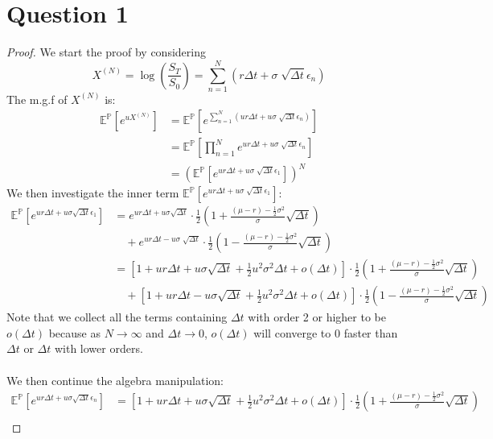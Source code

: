 \documentclass[12pt, letterpaper]{article}
\begin{document}
\part*{Question 1}
\begin{proof}
We start the proof by considering \[X^{(N)} = \log(\frac{S_T}{S_0}) = \sum_{n=1}^N (r\Delta t+\sigma \sqrt[]{\Delta t} \epsilon_n)\]
The m.g.f of $X^{(N)}$ is: \\
\begin{align*}
  \mathbb{E}^\mathbb{P}[e^{u X^{(N)}}] & =  \mathbb{E}^\mathbb{P}[e^{\sum_{n=1}^N (u r\Delta t+u\sigma \sqrt[]{\Delta t} \epsilon_n)}] \\
  & = \mathbb{E}^\mathbb{P} [\prod_{n=1}^N e^{u r\Delta t+u\sigma \sqrt[]{\Delta t} \epsilon_n}] \\
  & = (\mathbb{E}^\mathbb{P} [e^{u r\Delta t+u\sigma \sqrt[]{\Delta t} \epsilon_1}])^N \tag*{as $\epsilon_n$ is i.i.d}
\end{align*}
We then investigate the inner term $\mathbb{E}^\mathbb{P} [e^{u r\Delta t+ u\sigma \sqrt[]{\Delta t} \epsilon_1}]$:
\begin{align*}
  \mathbb{E}^\mathbb{P} [e^{u r\Delta t+u\sigma \sqrt{\Delta t} \epsilon_1}] &= e^{u r\Delta t +u\sigma \sqrt{\Delta t}} \cdot \frac{1}{2} (1 + \frac{(\mu -r) - \frac{1}{2}\sigma^2}{\sigma} \sqrt{\Delta t}) \\ 
    & \quad + e^{u r\Delta t-u\sigma \sqrt[]{\Delta t}} \cdot \frac{1}{2} (1 - \frac{(\mu -r) - \frac{1}{2}\sigma^2}{\sigma} \sqrt{\Delta t}) \\
    &= [1+u r\Delta t+u \sigma \sqrt{\Delta t} +\frac{1}{2}u^2\sigma^2\Delta t + o(\Delta t)] \cdot \frac{1}{2} (1 + \frac{(\mu -r) - \frac{1}{2}\sigma^2}{\sigma} \sqrt{\Delta t}) \\ 
    & \quad + [1+u r\Delta t-u \sigma \sqrt{\Delta t} +\frac{1}{2}u^2\sigma^2\Delta t + o(\Delta t)] \cdot \frac{1}{2} (1 - \frac{(\mu -r) - \frac{1}{2}\sigma^2}{\sigma} \sqrt{\Delta t}) 
\end{align*}
Note that we collect all the terms containing $\Delta t$ with order 2 or higher to be $o(\Delta t)$ because as $N\rightarrow \infty$ 
and $\Delta t \rightarrow 0$, $o(\Delta t)$ will converge to 0 faster than $\Delta t$ or $\Delta t$ with lower orders.
\\ \\ 
We then continue the algebra manipulation:
\begin{align*}
  \mathbb{E}^\mathbb{P} [e^{u r\Delta t+u\sigma \sqrt{\Delta t} \epsilon_n}] &= [1+u r\Delta t+u \sigma \sqrt{\Delta t} +\frac{1}{2}u^2\sigma^2\Delta t + o(\Delta t)] \cdot \frac{1}{2} (1 + \frac{(\mu -r) - \frac{1}{2}\sigma^2}{\sigma} \sqrt{\Delta t}) \\ 

\end{align*}
\end{proof}
\end{document}
